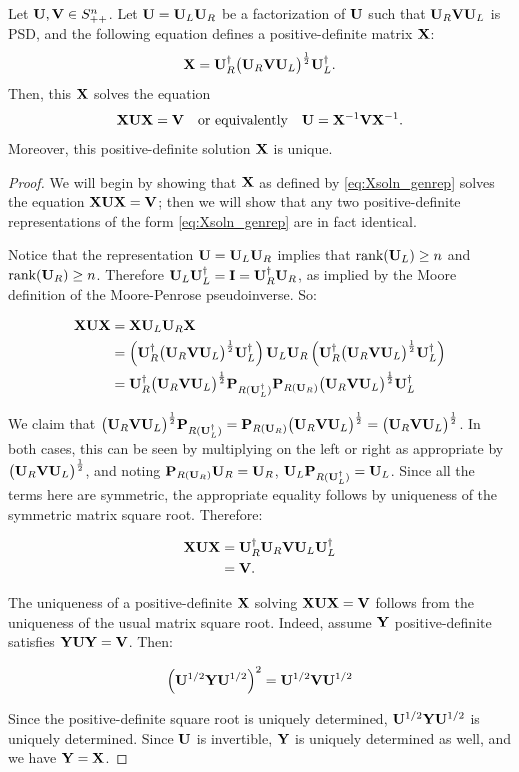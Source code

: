 \begin{lem} \label{lem:Xsoln}
Let $\mathbf{U}, \mathbf{V}\in S^{n}_{++}$. Let $\mathbf{U} = \mathbf{U}_L \mathbf{U}_R$ be a factorization of $\mathbf{U}$ such that $\mathbf{U}_R \mathbf{V} \mathbf{U}_L$ is PSD, and the following equation defines a positive-definite matrix $\mathbf{X}$:
\begin{equation}\label{eq:Xsoln_genrep}
\mathbf{X} = \mathbf{U}_R^\dagger \big(\mathbf{U}_R \mathbf{V} \mathbf{U}_L \big)^\frac{1}{2} \mathbf{U}_L^\dagger.
\end{equation}
Then, this $\mathbf{X}$ solves the equation
\[
\mathbf{X} \mathbf{U} \mathbf{X} = \mathbf{V}
\quad \text{or equivalently} \quad
\mathbf{U} = \mathbf{X}^{-1} \mathbf{V} \mathbf{X}^{-1}.
\]
Moreover, this positive-definite solution $\mathbf{X}$ is unique.
\end{lem}

\begin{proof}

We will begin by showing that $\mathbf{X}$ as defined by \cref{eq:Xsoln_genrep} solves the equation $\mathbf{X}\mathbf{U}\mathbf{X} = \mathbf{V}$; then we will show that any two positive-definite representations of the form \cref{eq:Xsoln_genrep} are in fact identical.

Notice that the representation $\mathbf{U} = \mathbf{U}_L \mathbf{U}_R$ implies that $\text{rank}(\mathbf{U}_L) \geq n$ and $\text{rank}(\mathbf{U}_R) \geq n$. Therefore $\mathbf{U}_L\mathbf{U}_L^\dagger = \mathbf{I} = \mathbf{U}_R^\dagger\mathbf{U}_R$, as implied by the Moore definition of the Moore-Penrose pseudoinverse. So:

\begin{align*}
\mathbf{X} \mathbf{U} \mathbf{X} 
  & = \mathbf{X} \mathbf{U}_L \mathbf{U}_R \mathbf{X} \\
  &= \left(\mathbf{U}_R^\dagger \big(\mathbf{U}_R \mathbf{V} \mathbf{U}_L \big)^\frac{1}{2} \mathbf{U}_L^\dagger\right)
     \mathbf{U}_L\mathbf{U}_R
     \left(\mathbf{U}_R^\dagger \big(\mathbf{U}_R \mathbf{V} \mathbf{U}_L \big)^\frac{1}{2} \mathbf{U}_L^\dagger\right) \\
  &= \mathbf{U}_R^\dagger \big(\mathbf{U}_R \mathbf{V} \mathbf{U}_L \big)^\frac{1}{2}  \mathbf{P}_{R(\mathbf{U}_L^\dagger)}\mathbf{P}_{R(\mathbf{U}_R)} \big(\mathbf{U}_R \mathbf{V} \mathbf{U}_L \big)^\frac{1}{2} \mathbf{U}_L^\dagger
  \end{align*}

We claim that $\big(\mathbf{U}_R \mathbf{V} \mathbf{U}_L \big)^\frac{1}{2}  \mathbf{P}_{R(\mathbf{U}_L^\dagger)} =  \mathbf{P}_{R(\mathbf{U}_R)} \big(\mathbf{U}_R \mathbf{V} \mathbf{U}_L \big)^\frac{1}{2} = \big(\mathbf{U}_R \mathbf{V} \mathbf{U}_L\big)^\frac{1}{2}$. In both cases, this can be seen by multiplying on the left or right as appropriate by $\big(\mathbf{U}_R \mathbf{V} \mathbf{U}_L\big)^\frac{1}{2}$, and noting $\mathbf{P}_{R(\mathbf{U}_R)} \mathbf{U}_R = \mathbf{U}_R$, $\mathbf{U}_L \mathbf{P}_{R(\mathbf{U}_L^\dagger)} = \mathbf{U}_L$. Since all the terms here are symmetric, the appropriate equality follows by uniqueness of the symmetric matrix square root. Therefore:

\begin{align*}
  \mathbf{X} \mathbf{U} \mathbf{X}  &= \mathbf{U}_R^\dagger \mathbf{U}_R \mathbf{V} \mathbf{U}_L \mathbf{U}_L^\dagger \\     
  &= \mathbf{V}.
\end{align*}

The uniqueness of a positive-definite $\mathbf{X}$ solving $\mathbf{X}\mathbf{U}\mathbf{X} = \mathbf{V}$ follows from the uniqueness of the usual matrix square root. Indeed, assume $\mathbf{Y}$ positive-definite satisfies $\mathbf{Y}\mathbf{U}\mathbf{Y} = \mathbf{V}$. Then:

\[
\left(\mathbf{U}^{1/2} \mathbf{Y} \mathbf{U}^{1/2}\right)^2 = \mathbf{U}^{1/2} \mathbf{V} \mathbf{U}^{1/2}
\]

Since the positive-definite square root is uniquely determined, $\mathbf{U}^{1/2} \mathbf{Y} \mathbf{U}^{1/2}$ is uniquely determined. Since $\mathbf{U}$ is invertible, $\mathbf{Y}$ is uniquely determined as well, and we have $\mathbf{Y} = \mathbf{X}$.
\end{proof}



